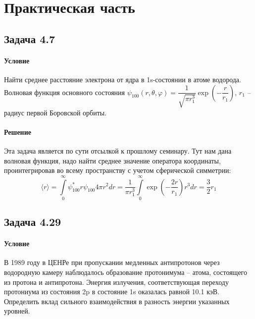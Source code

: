 \documentclass[12pt]{article}
\begin{document}
\section{Практическая часть}
\subsection{Задача 4.7}
\label{task_4.7}
\paragraph{Условие} Найти среднее расстояние электрона от ядра в 1s-состоянии в атоме водорода. Волновая функция основного состояния $\psi_{100}(r, \theta, \varphi) = \dfrac{1}{\sqrt{\pi r_1^3}}\exp{\left(-\dfrac{r}{r_1} \right)}$, $r_1$ -- радиус первой Боровской орбиты.
\paragraph{Решение}
Эта задача является по сути отсылкой к прошлому семинару. Тут нам дана волновая функция, надо найти среднее значение оператора координаты, проинтегрировав во всему пространству с учетом сферической симметрии:
\begin{equation}
    \langle r\rangle = \int\limits_0^{\infty} \psi^*_{100} r \psi_{100} 4\pi r^2 dr =\dfrac{1}{\pi r_1^3}\int\limits_0^{\infty} \exp{\left(- \dfrac{2r}{r_1} \right)} r^3 dr = \dfrac{3}{2}r_1
\end{equation}

\subsection{Задача 4.29}
\label{task_4.29}
\paragraph{Условие} В 1989 году в ЦЕНРе при пропускании медленных антипротонов через водородную камеру наблюдалось образование протонимума -- атома, состоящего из протона и антипротона. Энергия излучения, соответствующая переходу протониума из состояния 2p в состояние 1s оказалась равной 10.1 кэВ. Определить вклад сильного взаимодействия в разность энергии указанных уровней.
\end{document}
